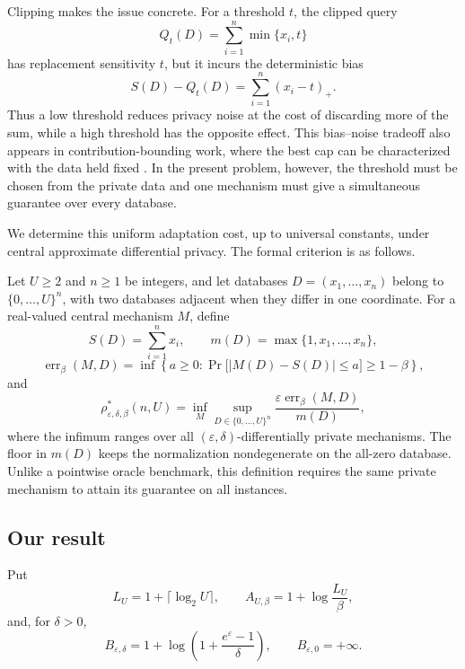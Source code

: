 \documentclass[11pt]{article}
\begin{document}
Clipping makes the issue concrete.  For a threshold $t$, the clipped query
\[
 Q_t(D)=\sum_{i=1}^n\min\{x_i,t\}
\]
has replacement sensitivity $t$, but it incurs the deterministic bias
\[
 S(D)-Q_t(D)=\sum_{i=1}^n(x_i-t)_+.
\]
Thus a low threshold reduces privacy noise at the cost of discarding more of
the sum, while a high threshold has the opposite effect.  This bias--noise
tradeoff also appears in contribution-bounding work, where the best cap can
be characterized with the data held fixed
\cite{AminKuleszaMunozMedinaVassilvitskii2019Contributions}.  In the present
problem, however, the threshold must be chosen from the private data and one
mechanism must give a simultaneous guarantee over every database.

We determine this uniform adaptation cost, up to universal constants, under
central approximate differential privacy.  The formal criterion is as follows.

Let $U\ge2$ and $n\ge1$ be integers, and let databases
$D=(x_1,\ldots,x_n)$ belong to
$\{0,\ldots,U\}^n$, with two databases adjacent when they differ in one
coordinate.  For a real-valued central mechanism $M$, define
\[
 S(D)=\sum_{i=1}^n x_i,
 \qquad
 m(D)=\max\{1,x_1,\ldots,x_n\},
\]
\[
 \operatorname{err}_{\beta}(M,D)
 =\inf\left\{a\ge0:
   \Pr\bigl[|M(D)-S(D)|\le a\bigr]\ge1-\beta\right\},
\]
and
\[
 \rho^*_{\varepsilon,\delta,\beta}(n,U)
 =\inf_M\sup_{D\in\{0,\ldots,U\}^n}
 \frac{\varepsilon\operatorname{err}_{\beta}(M,D)}{m(D)},
\]
where the infimum ranges over all $(\varepsilon,\delta)$-differentially
private mechanisms.  The floor in $m(D)$ keeps the normalization
nondegenerate on the all-zero database.  Unlike a pointwise oracle benchmark,
this definition requires the same private mechanism to attain its guarantee
on all instances.

\subsection{Our result}

Put
\[
 L_U=1+\lceil\log_2U\rceil,
 \qquad
 A_{U,\beta}=1+\log\frac{L_U}{\beta},
\]
and, for $\delta>0$,
\[
 B_{\varepsilon,\delta}
 =1+\log\left(1+\frac{e^\varepsilon-1}{\delta}\right),
 \qquad B_{\varepsilon,0}=+\infty.
\]
\end{document}
